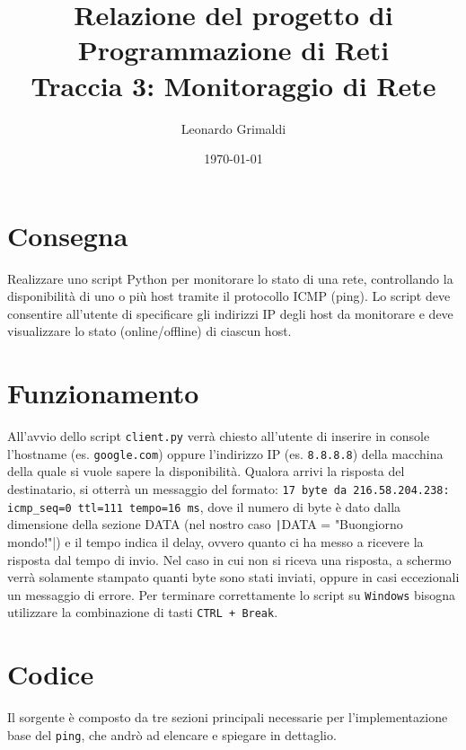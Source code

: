 \documentclass[a4paper,12pt]{report}
\title{Relazione del progetto di Programmazione di Reti 
    \\ Traccia 3: Monitoraggio di Rete}
\author{Leonardo Grimaldi}
\date{\today}
\begin{document}
\maketitle
\tableofcontents
\chapter{Consegna}
Realizzare uno script Python per monitorare lo stato di una rete, controllando la disponibilità di uno o più host tramite il protocollo ICMP (ping).
%
Lo script deve consentire all'utente di specificare gli indirizzi IP degli host da monitorare e deve visualizzare lo stato (online/offline) di ciascun host.
\chapter{Funzionamento}
All'avvio dello script \texttt{client.py} verrà chiesto all'utente di inserire in console l'hostname (es. \texttt{google.com}) oppure l'indirizzo IP (es. \texttt{8.8.8.8}) della macchina della quale si vuole sapere la disponibilità.
%
Qualora arrivi la risposta del destinatario, si otterrà un messaggio del formato: \texttt{17 byte da 216.58.204.238: icmp\_seq=0 ttl=111 tempo=16 ms}, dove il numero di byte è dato dalla dimensione della sezione DATA (nel nostro caso \texttt|DATA = "Buongiorno mondo!"|) e il tempo indica il delay, ovvero quanto ci ha messo a ricevere la risposta dal tempo di invio.
%
Nel caso in cui non si riceva una risposta, a schermo verrà solamente stampato quanti byte sono stati inviati, oppure in casi eccezionali un messaggio di errore.
%
Per terminare correttamente lo script su \texttt{Windows} bisogna utilizzare la combinazione di tasti \texttt{CTRL + Break}.
\chapter{Codice}
Il sorgente è composto da tre sezioni principali necessarie per l'implementazione base del \texttt{ping}, che andrò ad elencare e spiegare in dettaglio.
\end{document}
